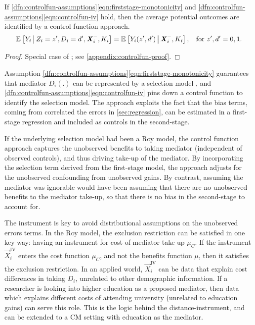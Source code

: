 \begin{theorem}
    \label{thm:controlfun}
    If \ref{dfn:controlfun-assumptions}\eqref{eqn:firststage-monotonicity} and \ref{dfn:controlfun-assumptions}\eqref{eqn:controlfun-iv} hold, then the average potential outcomes are identified by a control function approach.
    \[ \mathbb{E}_{} \left[ Y_i \, \middle\vert \, Z_i = z', D_i = d', \boldsymbol{\mathit{X}}_i^-, K_i \right]
        = \mathbb{E}_{} \left[ Y_i(z', d') \, \middle\vert \, \boldsymbol{\mathit{X}}_i^-, K_i \right]
        , \;\; \text{ for } z', d' = 0,1. \]
\end{theorem}
\begin{proof}
    Special case of \citet[Theorem~1]{imbens2009identification}; see \autoref{appendix:controlfun-proof}.
\end{proof}

Assumption \ref{dfn:controlfun-assumptions}\eqref{eqn:firststage-monotonicity} guarantees that mediator $D_i(.)$ can be represented by a selection model \citep{vytlacil2002independence}, and \ref{dfn:controlfun-assumptions}\eqref{eqn:controlfun-iv} pins down a control function to identify the selection model.
The approach exploits the fact that the bias terms, coming from correlated the errors in \autoref{sec:regression}, can be estimated in a first-stage regression and included as controls in the second-stage.

If the underlying selection model had been a Roy model, the control function approach captures the unobserved benefits to taking mediator (independent of observed controls), and thus driving take-up of the mediator.
By incorporating the selection term derived from the first-stage model, the approach adjusts for the unobserved confounding from unobserved gains.
By contrast, assuming the mediator was ignorable would have been assuming that there are no unobserved benefits to the mediator take-up, so that there is no bias in the second-stage to account for.

The instrument is key to avoid distributional assumptions on the unobserved errors terms.
In the Roy model, the exclusion restriction can be satisfied in one key way: having an instrument for cost of mediator take up $\mu_C$.
If the instrument $\vec X_i^{\text{IV}}$ enters the cost function $\mu_C$, and not the benefits function $\mu$, then it satisfies the exclusion restriction.
In an applied world, $\vec X_i^{\text{IV}}$ can be data that explain cost differences in taking $D_i$, unrelated to other demographic information.
If a researcher is looking into higher education as a proposed mediator, then data which explains different costs of attending university (unrelated to education gains) can serve this role.
This is the logic behind the \cite{card1993using} distance-instrument, and can be extended to a CM setting with education as the mediator.

